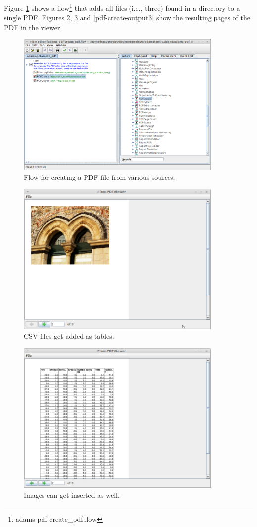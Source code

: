 \documentclass[a4paper]{book}
\begin{document}
Figure \ref{pdf-create-flow} shows a flow\footnote{adams-pdf-create\_pdf.flow} 
that adds all files (i.e., three) found in a directory to a single PDF. 
Figures \ref{pdf-create-output1}, \ref{pdf-create-output2} and 
\ref{pdf-create-output3} show the resulting pages of the PDF in the viewer.

\begin{figure}[htb]
  \centering
  \includegraphics[width=10.0cm]{images/pdf-create-flow.png}
  \caption{Flow for creating a PDF file from various sources.}
  \label{pdf-create-flow}
\end{figure}

\begin{figure}[htb]
  \centering
  \includegraphics[width=10.0cm]{images/pdf-create-output1.png}
  \caption{CSV files get added as tables.}
  \label{pdf-create-output1}
\end{figure}

\begin{figure}[htb]
  \centering
  \includegraphics[width=10.0cm]{images/pdf-create-output2.png}
  \caption{Images can get inserted as well.}
  \label{pdf-create-output2}
\end{figure}
\end{document}
